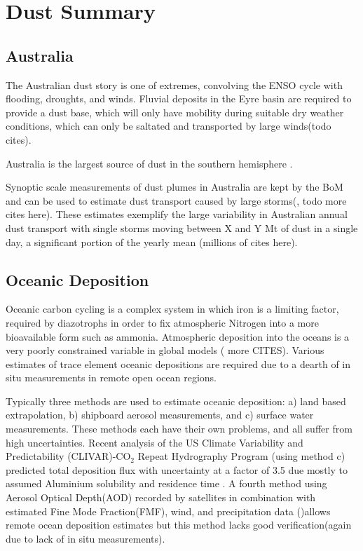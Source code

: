 \section{Dust Summary}

\subsection{Australia}

The Australian dust story is one of extremes, convolving the ENSO cycle with flooding, droughts, and winds.
Fluvial deposits in the Eyre basin are required to provide a dust base, which will only have mobility during suitable dry weather conditions, which can only be saltated and transported by large winds(todo cites).

Australia is the largest source of dust in the southern hemisphere \cite{Rotstayn_2011}.

Synoptic scale measurements of dust plumes in Australia are kept by the BoM and can be used to estimate dust transport caused by large storms(\cite{Leys_2011}, todo more cites here). 
These estimates exemplify the large variability in Australian annual dust transport with single storms moving between X and Y Mt of dust in a single day, a significant portion of the yearly mean (millions of cites here).

\subsection{Oceanic Deposition}
Oceanic carbon cycling is a complex system in which iron is a limiting factor, required by diazotrophs in order to fix atmospheric Nitrogen into a more bioavailable form such as ammonia. 
Atmospheric deposition into the oceans is a very poorly constrained variable in global models (\cite{Grand_2015} more CITES). 
Various estimates of trace element oceanic depositions are required due to a dearth of in situ measurements in remote open ocean regions.

Typically three methods are used to estimate oceanic deposition: a) land based extrapolation, b) shipboard aerosol measurements, and c) surface water measurements. 
These methods each have their own problems, and all suffer from high uncertainties. 
Recent analysis of the US Climate Variability and Predictability (CLIVAR)-CO$_2$ Repeat Hydrography Program (using method c) predicted total deposition flux with uncertainty at a factor of 3.5 due mostly to assumed Aluminium solubility and residence time \cite{Grand_2015}.
A fourth method using Aerosol Optical Depth(AOD) recorded by satellites in combination with estimated Fine Mode Fraction(FMF), wind, and precipitation data ()allows remote ocean deposition estimates but this method lacks good verification(again due to lack of in situ measurements). 


  
  
  
  